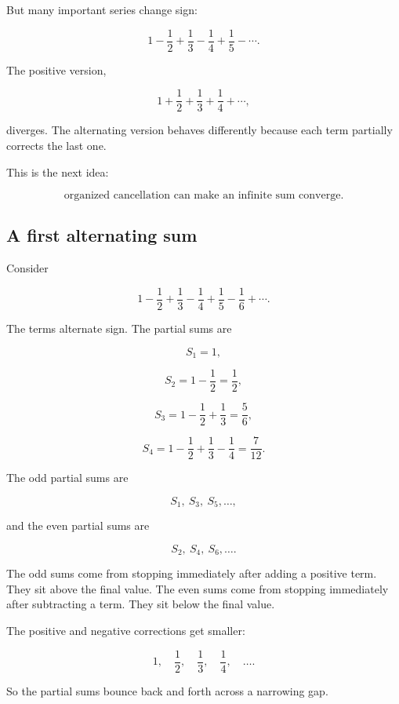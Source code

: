 But many important series change sign:

\[
1-\frac12+\frac13-\frac14+\frac15-\cdots.
\]

The positive version,

\[
1+\frac12+\frac13+\frac14+\cdots,
\]

diverges.  The alternating version behaves differently because each term partially
corrects the last one.

This is the next idea:

\[
\boxed{
\text{organized cancellation can make an infinite sum converge.}
}
\]

\subsection{A first alternating sum}
\label{subsec:first-alternating-sum}

Consider

\[
1-\frac12+\frac13-\frac14+\frac15-\frac16+\cdots.
\]

The terms alternate sign.  The partial sums are

\[
S_1=1,
\]

\[
S_2=1-\frac12=\frac12,
\]

\[
S_3=1-\frac12+\frac13=\frac56,
\]

\[
S_4=1-\frac12+\frac13-\frac14=\frac7{12}.
\]

The odd partial sums are

\[
S_1,\ S_3,\ S_5,\ldots,
\]

and the even partial sums are

\[
S_2,\ S_4,\ S_6,\ldots.
\]

The odd sums come from stopping immediately after adding a positive term.  They sit
above the final value.  The even sums come from stopping immediately after subtracting
a term.  They sit below the final value.

The positive and negative corrections get smaller:

\[
1,\quad \frac12,\quad \frac13,\quad \frac14,\quad\ldots.
\]

So the partial sums bounce back and forth across a narrowing gap.

